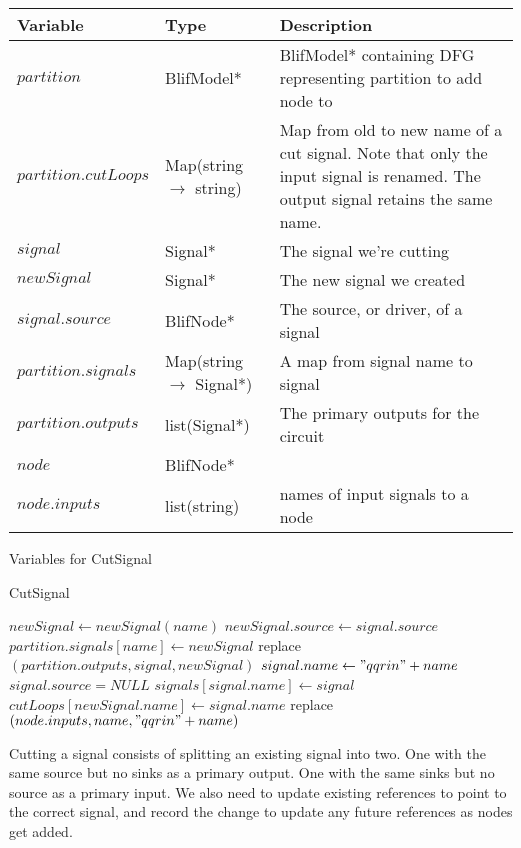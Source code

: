 \documentclass[12pt,final,oneside]{article} %
\begin{document}
\begin{algorithm}
    \begin{center}
        \begin{tabularx}{\linewidth}{llX}
        \toprule
        Variable & Type & Description\\
        \midrule
        $partition$ & BlifModel* & BlifModel* containing DFG representing partition to add node to\\
        $partition.cutLoops$ & Map(string $\to$ string) & Map from old to new name of a cut signal. Note that only the input signal is renamed. The output signal retains the same name.\\
        $signal$ & Signal* & The signal we're cutting\\
        $newSignal$ & Signal* & The new signal we created\\
        $signal.source$ & BlifNode* & The source, or driver, of a signal\\
        $partition.signals$ & Map(string $\to$ Signal*) & A map from signal name to signal\\
        $partition.outputs$ & list(Signal*) & The primary outputs for the circuit\\
        $node$ & BlifNode* & \\
        $node.inputs$ & list(string) & names of input signals to a node\\
        \bottomrule
        \end{tabularx}
        \caption{Variables for CutSignal}
        \label{varCutsignal}
    \end{center}
   \caption{CutSignal}\label{cutsignal}
   \begin{algorithmic}[1]
         \State $newSignal \gets new Signal(name)$ 
         \State $newSignal.source \gets signal.source$
         \State $partition.signals[name] \gets newSignal$
         \State replace$(partition.outputs, signal, newSignal)$ 
         \State $signal.name \gets "qqrin"+name$
         \State $signal.source = NULL$
         \State $signals[signal.name] \gets signal$
         \State $cutLoops[newSignal.name] \gets signal.name$
            \State replace$(node.inputs, name, "qqrin"+name)$
         \EndFor
      \EndProcedure
   \end{algorithmic}
\end{algorithm}
Cutting a signal consists of splitting an existing signal into two. One with the same source but no sinks as a primary output. One with the same sinks but no source as a primary input. We also need to update existing references to point to the correct signal, and record the change to update any future references as nodes get added.
\end{document}
